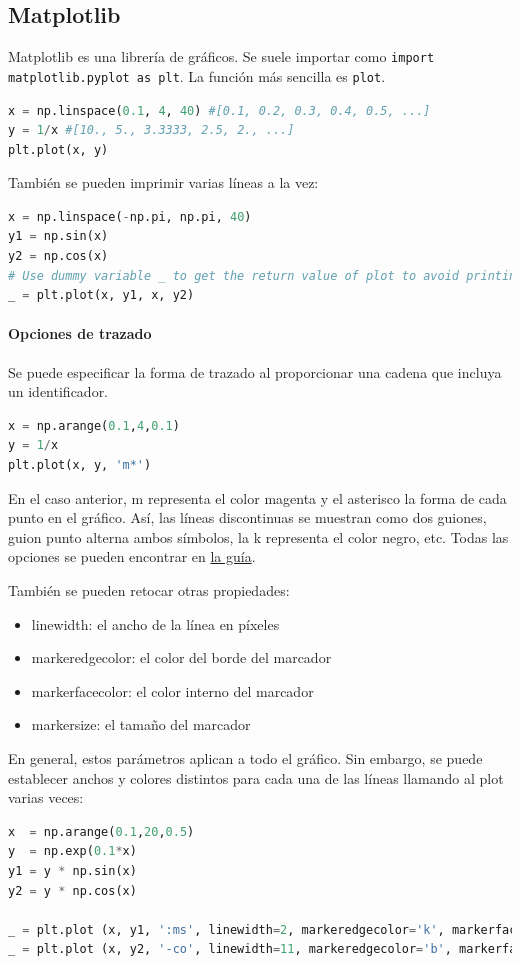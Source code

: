 \subsection{Matplotlib}
Matplotlib es una librería de gráficos. Se suele importar como \texttt{import matplotlib.pyplot as plt}. La función más sencilla es \texttt{plot}.
\begin{lstlisting}[language=Python]
x = np.linspace(0.1, 4, 40) #[0.1, 0.2, 0.3, 0.4, 0.5, ...]
y = 1/x #[10., 5., 3.3333, 2.5, 2., ...]
plt.plot(x, y)
\end{lstlisting}

También se pueden imprimir varias líneas a la vez:
\begin{lstlisting}[language=Python]
x = np.linspace(-np.pi, np.pi, 40) 
y1 = np.sin(x)
y2 = np.cos(x)
# Use dummy variable _ to get the return value of plot to avoid printing its reference
_ = plt.plot(x, y1, x, y2)
\end{lstlisting}

\paragraph{Opciones de trazado}
Se puede especificar la forma de trazado al proporcionar una cadena que incluya un identificador. 
\begin{lstlisting}[language=Python]
x = np.arange(0.1,4,0.1)
y = 1/x
plt.plot(x, y, 'm*')
\end{lstlisting}
En el caso anterior, m representa el color magenta y el asterisco la forma de cada punto en el gráfico. Así, las líneas discontinuas se muestran como dos guiones, guion punto alterna ambos símbolos, la k representa el color negro, etc. Todas las opciones se pueden encontrar en \href{https://matplotlib.org/stable/api/_as_gen/matplotlib.axes.Axes.plot.html#matplotlib.axes.Axes.plot}{la guía}.

También se pueden retocar otras propiedades:
\begin{itemize}
\item linewidth: el ancho de la línea en píxeles
\item markeredgecolor: el color del borde del marcador
\item markerfacecolor: el color interno del marcador
\item markersize: el tamaño del marcador
\end{itemize}
En general, estos parámetros aplican a todo el gráfico. Sin embargo, se puede establecer anchos y colores distintos para cada una de las líneas llamando al plot varias veces:
\begin{lstlisting}[language=Python]
x  = np.arange(0.1,20,0.5)
y  = np.exp(0.1*x)
y1 = y * np.sin(x)
y2 = y * np.cos(x)

_ = plt.plot (x, y1, ':ms', linewidth=2, markeredgecolor='k', markerfacecolor='r', markersize=5)
_ = plt.plot (x, y2, '-co', linewidth=11, markeredgecolor='b', markerfacecolor='c', markersize=11)
\end{lstlisting}

